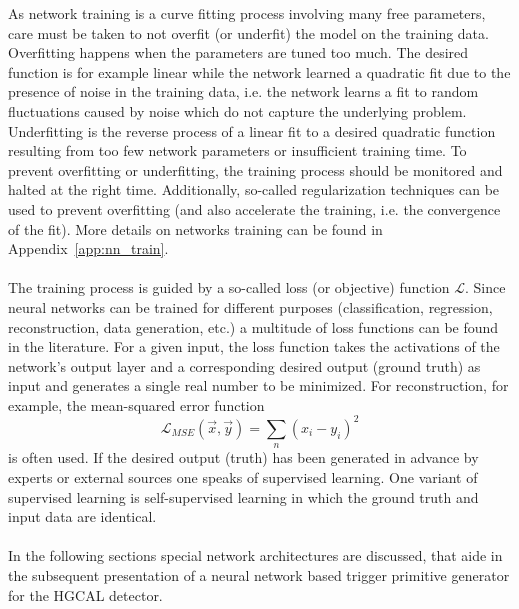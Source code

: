\documentclass[../../main.tex]{subfiles}
\begin{document}
As network training is a curve fitting process involving many free parameters, care must be taken to not overfit (or underfit) the model on the training data. Overfitting happens when the parameters are tuned too much. The desired function is for example linear while the network learned a quadratic fit due to the presence of noise in the training data, i.e. the network learns a fit to random fluctuations caused by noise which do not capture the underlying problem. Underfitting is the reverse process of a linear fit to a desired quadratic function resulting from too few network parameters or insufficient training time. To prevent overfitting or underfitting, the training process should be monitored and halted at the right time. Additionally, so-called regularization techniques can be used to prevent overfitting (and also accelerate the training, i.e. the convergence of the fit). More details on networks training can be found in Appendix~\ref{app:nn_train}.\\
\\
The training process is guided by a so-called loss (or objective) function $\mathscr{L}$. Since neural networks can be trained for different purposes (classification, regression, reconstruction, data generation, etc.) a multitude of loss functions can be found in the literature. For a given input, the loss function takes the activations of the network's output layer and a corresponding desired output (ground truth) as input and generates a single real number to be minimized. For reconstruction, for example, the mean-squared error function
\begin{equation}
	\mathscr{L}_{MSE}(\vec{x}, \vec{y}) = \sum_n{(x_i - y_i)^2}
	\label{eq:mse}
\end{equation}
is often used. If the desired output (truth) has been generated in advance by experts or external sources one speaks of supervised learning. One variant of supervised learning is self-supervised learning in which the ground truth and input data are identical.\\
\\
In the following sections special network architectures are discussed, that aide in the subsequent presentation of a neural network based trigger primitive generator for the HGCAL detector.
\end{document}
